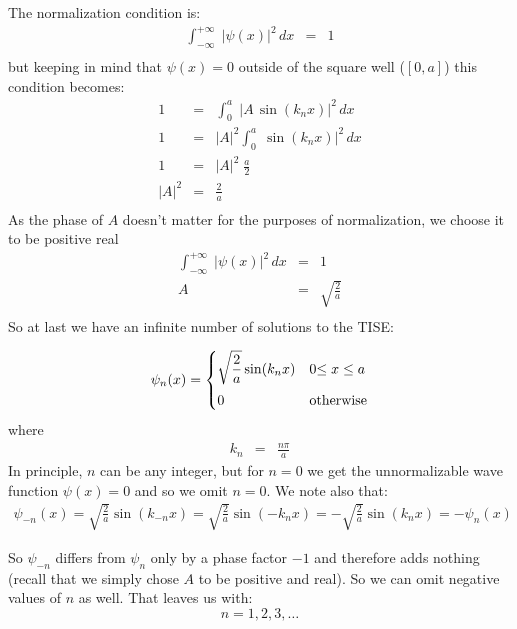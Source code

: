 \documentclass[12pt]{book}
\begin{document}
The normalization condition is:
\begin{eqnarray*}
\int_{-\infty}^{+\infty} \; |\psi(x)|^2 \, dx &=& 1 \\
\end{eqnarray*}
but keeping in mind that $\psi(x)=0$ outside of the square well ($[0,a]$) this condition becomes:
\begin{eqnarray*}
1 &=& \int_{0}^{a} \; |A \, \sin(k_n x)|^2 \, dx \\
1 &=& |A|^2 \int_{0}^{a} \; \sin(k_n x)|^2 \, dx \\
1 &=& |A|^2 \; \frac{a}{2} \\
|A|^2 &=& \frac{2}{a} \\
\end{eqnarray*}
As the phase of $A$ doesn't matter for the purposes of normalization, we choose it to be positive real
\begin{eqnarray*}
\int_{-\infty}^{+\infty} \; |\psi(x)|^2 \, dx &=& 1 \\
A &=& \sqrt{\frac{2}{a}} \\
\end{eqnarray*}
So at last we have an infinite number of solutions to the TISE:

\begin{equation}
\label{eqn:psin-isw}
\psi_n(x) = 
\begin{cases}    
   {\displaystyle \sqrt{\frac{2}{a}}\sin(k_n x)} & 0 {\displaystyle \leq x \leq a} \\[8pt]
   0 & {\rm otherwise} \\
\end{cases}   
\end{equation}
where
\begin{eqnarray*}
k_n&=&\frac{n\pi}{a}
\end{eqnarray*}
In principle, $n$ can be any integer, but for $n=0$ we get the unnormalizable wave function $\psi(x)=0$ and so we omit $n=0$.  We note also that:
\begin{eqnarray*}
\psi_{-n}(x) = \sqrt{\frac{2}{a}} \sin(k_{-n}x) = \sqrt{\frac{2}{a}} \sin(-k_{n}x) = -\sqrt{\frac{2}{a}} \sin(k_{n}x) = -\psi_{n}(x)
\end{eqnarray*}


So $\psi_{-n}$ differs from $\psi_{n}$ only by a phase factor $-1$ and therefore adds nothing (recall that we simply chose $A$ to be positive and real).  So we can omit negative values of $n$ as well.  That leaves us with:
\begin{equation*}
n = 1,2,3,\ldots
\end{equation*}
\end{document}
